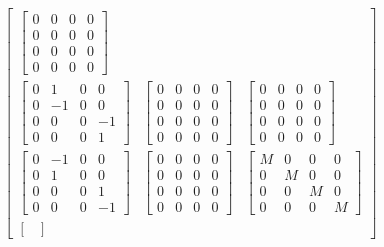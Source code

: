 \documentclass[11pt]{article} %
\begin{document}
\begin{align}
\begin{bmatrix}
\begin{bmatrix}
            0 & 0 & 0 & 0\\
            0 & 0 & 0 & 0\\
            0 & 0 & 0 & 0\\
            0 & 0 & 0 & 0
        \end{bmatrix} \\
        \begin{bmatrix}
            0 & 1 & 0 & 0\\
            0 & -1 & 0 & 0\\
            0 & 0 & 0 & -1\\
            0 & 0 & 0 & 1
        \end{bmatrix}  & 
        \begin{bmatrix}
            0 & 0 & 0 & 0\\
            0 & 0 & 0 & 0\\
            0 & 0 & 0 & 0\\
            0 & 0 & 0 & 0
        \end{bmatrix}   &
        \begin{bmatrix}
            0 & 0 & 0 & 0\\
            0 & 0 & 0 & 0\\
            0 & 0 & 0 & 0\\
            0 & 0 & 0 & 0
        \end{bmatrix} \\
        \begin{bmatrix}
            0 & -1 & 0 & 0\\
            0 & 1 & 0 & 0\\
            0 & 0 & 0 & 1\\
            0 & 0 & 0 & -1
        \end{bmatrix}  & 
        \begin{bmatrix}
            0 & 0 & 0 & 0\\
            0 & 0 & 0 & 0\\
            0 & 0 & 0 & 0\\
            0 & 0 & 0 & 0
        \end{bmatrix}   &
        \begin{bmatrix}
            M & 0 & 0 & 0\\
            0 & M & 0 & 0\\
            0 & 0 & M & 0\\
            0 & 0 & 0 & M
        \end{bmatrix} \\
        \begin{bmatrix}

\end{bmatrix}
\end{bmatrix}
\end{align}
\end{document}

